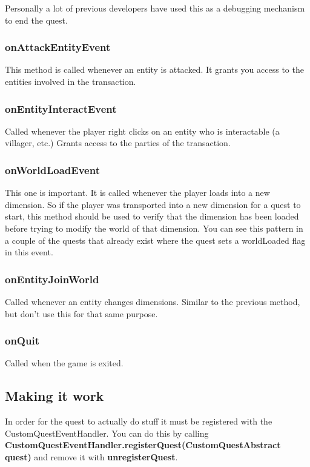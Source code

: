 \documentclass[12pt]{article}
\begin{document}
Personally a lot of previous developers have used this as a debugging mechanism to end the quest.

\subsubsection{onAttackEntityEvent}

This method is called whenever an entity is attacked. It grants you access to the entities involved in the transaction.

\subsubsection{onEntityInteractEvent}

Called whenever the player right clicks on an entity who is interactable (a villager, etc.) Grants access to the parties of the transaction.

\subsubsection{onWorldLoadEvent}

This one is important. It is called whenever the player loads into a new dimension. So if the player was transported into a new dimension for a quest to start, this method should be used to verify that the dimension has been loaded before trying to modify the world of that dimension. You can see this pattern in a couple of the quests that already exist where the quest sets a worldLoaded flag in this event.

\subsubsection{onEntityJoinWorld}

Called whenever an entity changes dimensions. Similar to the previous method, but don't use this for that same purpose.

\subsubsection{onQuit}

Called when the game is exited.


\subsection{Making it work}
In order for the quest to actually do stuff it must be registered with the CustomQuestEventHandler. You can do this by calling {\bfseries CustomQuestEventHandler.registerQuest(CustomQuestAbstract quest)} and remove it with {\bfseries unregisterQuest}.
\end{document}
